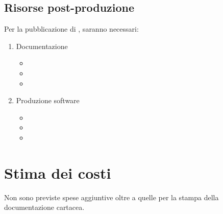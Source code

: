 \subsection{Risorse post-produzione}
Per la pubblicazione di \ProjectTitle{}, saranno necessari:
\begin{enumerate}
	\item Documentazione
	\begin{itemize}
		\item 
		\item 
		\item 
	\end{itemize}
	\item Produzione software
	\begin{itemize}
		\item 
		\item 
		\item 
	\end{itemize}
\end{enumerate}

\section{Stima dei costi}
Non sono previste spese aggiuntive oltre a quelle per la stampa della documentazione cartacea.
